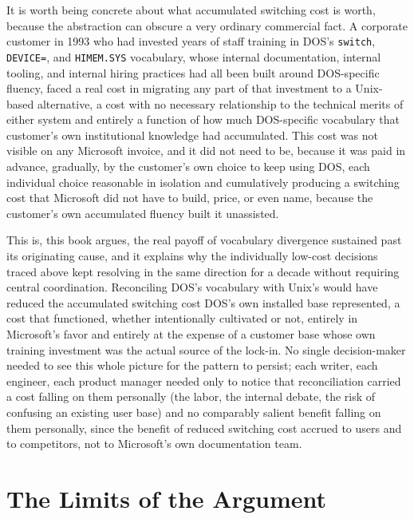 \documentclass[11pt]{book}
\begin{document}
It is worth being concrete about what accumulated switching cost is worth, because the abstraction can obscure a very ordinary commercial fact. A corporate customer in 1993 who had invested years of staff training in DOS's \texttt{switch}, \texttt{DEVICE=}, and \texttt{HIMEM.SYS} vocabulary, whose internal documentation, internal tooling, and internal hiring practices had all been built around DOS-specific fluency, faced a real cost in migrating any part of that investment to a Unix-based alternative, a cost with no necessary relationship to the technical merits of either system and entirely a function of how much DOS-specific vocabulary that customer's own institutional knowledge had accumulated. This cost was not visible on any Microsoft invoice, and it did not need to be, because it was paid in advance, gradually, by the customer's own choice to keep using DOS, each individual choice reasonable in isolation and cumulatively producing a switching cost that Microsoft did not have to build, price, or even name, because the customer's own accumulated fluency built it unassisted.

This is, this book argues, the real payoff of vocabulary divergence sustained past its originating cause, and it explains why the individually low-cost decisions traced above kept resolving in the same direction for a decade without requiring central coordination. Reconciling DOS's vocabulary with Unix's would have reduced the accumulated switching cost DOS's own installed base represented, a cost that functioned, whether intentionally cultivated or not, entirely in Microsoft's favor and entirely at the expense of a customer base whose own training investment was the actual source of the lock-in. No single decision-maker needed to see this whole picture for the pattern to persist; each writer, each engineer, each product manager needed only to notice that reconciliation carried a cost falling on them personally (the labor, the internal debate, the risk of confusing an existing user base) and no comparably salient benefit falling on them personally, since the benefit of reduced switching cost accrued to users and to competitors, not to Microsoft's own documentation team.

\section{The Limits of the Argument}
\end{document}
